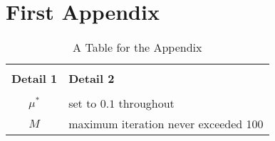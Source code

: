 \chapter{First Appendix}\label{app:some-appendix-topic}

\renewcommand{\thefigure}{\Alph{chapter}.\arabic{figure}}
\renewcommand{\thetable}{\Alph{chapter}.\arabic{table}}

\lipsum[1]

\lipsum[2]

\lipsum[3]

\lipsum[4]

\lipsum[5]

\lipsum[6]




\begin{table}[h]
\caption{A Table for the Appendix}
\begin{tabular}{ c  l } 
 \hline
\\ \textbf{ Detail 1} & \textbf{Detail 2}  \\ [1ex] 
 \hline \\
 $\mu^*$ & set to $0.1$ throughout\\  [1ex]
 $M$ & maximum iteration never exceeded 100\\  [1ex]
\end{tabular}
\label{table:appendix-table}
\end{table}